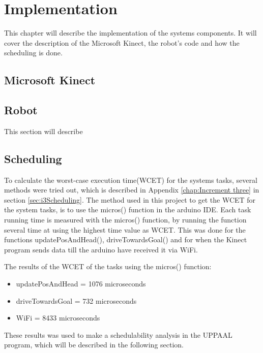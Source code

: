 \chapter{Implementation}
\label{chap:Implementation}
This chapter will describe the implementation of the systems components. It will cover the description of the Microsoft Kinect, the robot's code and how the scheduling is done. 

\section{Microsoft Kinect}
\label{sec:Microsoft Kinect Implementation}

\section{Robot}
\label{sec:Robot}
This section will describe 

\section{Scheduling}
\label{sec:Scheduling implementation}
To calculate the worst-case execution time(WCET) for the systems tasks, several methods were tried out, which is described in Appendix \ref{chap:Increment three} in section \ref{sec:i3Scheduling}. 
The method used in this project to get the WCET for the system tasks, is to use the micros() function in the arduino IDE. \newline
Each task running time is measured with the micros() function, by running the function several time at using the highest time value as WCET. This was done for the functions updatePosAndHead(), driveTowardsGoal() and for when the Kinect program sends data till the arduino have received it via WiFi.

The results of the WCET of the tasks using the micros() function:
\begin{itemize}
	\item updatePosAndHead = 1076 microseconds
	\item driveTowardsGoal = 732 microseconds
	\item WiFi = 8433 microseconds
\end{itemize}
These results was used to make a schedulability analysis in the UPPAAL program, which will be described in the following section.
